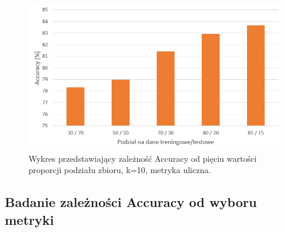 \documentclass{classrep}
\begin{document}
\begin{figure}[h!]
    \centering
    \includegraphics[width=1\textwidth]{accuracyTT.png}
    \caption{Wykres przedstawiający zależność Accuracy od pięciu wartości proporcji podziału zbioru, k=10, metryka uliczna.}
    \label{accuracyTT}
\end{figure}

\newpage
\subsection{Badanie zależności Accuracy od wyboru metryki}
\end{document}
